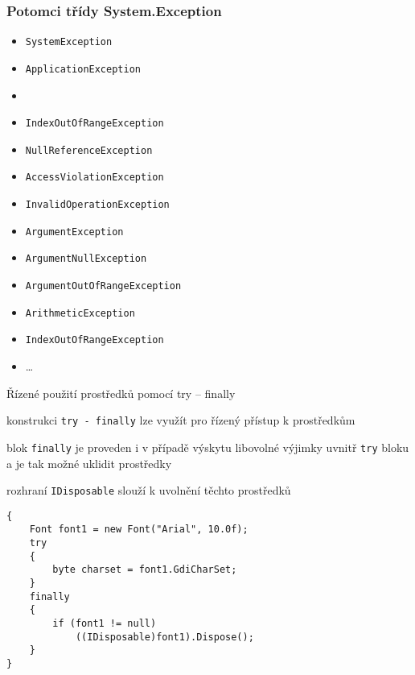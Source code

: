 \begin{frame}[fragile]
\frametitle{Potomci třídy System.Exception}
\begin{noteblock}{}
\begin{itemize}
\item \lstinline|SystemException|
\item \lstinline|ApplicationException|
\item[]
\item \lstinline|IndexOutOfRangeException|
\item \lstinline|NullReferenceException|
\item \lstinline|AccessViolationException|
\item \lstinline|InvalidOperationException|
\item \lstinline|ArgumentException|
\item \lstinline|ArgumentNullException|
\item \lstinline|ArgumentOutOfRangeException|
\item \lstinline|ArithmeticException|
\item \lstinline|IndexOutOfRangeException|
\item \ldots
\end{itemize}
\end{noteblock}

\end{frame}




\begin{frame}[fragile]
\begin{bitemize}{Řízené použití prostředků pomocí try -- finally}
\item konstrukci \lstinline|try - finally| lze využít pro řízený přístup k prostředkům
\item blok \lstinline|finally| je proveden i v případě výskytu libovolné výjimky uvnitř \lstinline|try| bloku a je tak možné uklidit prostředky
\item rozhraní \lstinline|IDisposable| slouží k uvolnění těchto prostředků
\end{bitemize}
\vfill
\begin{yesblock}
\begin{lstlisting}
{
    Font font1 = new Font("Arial", 10.0f);
    try
    {
        byte charset = font1.GdiCharSet;
    }
    finally
    {
        if (font1 != null)
            ((IDisposable)font1).Dispose();
    }
}
\end{lstlisting}
\end{yesblock}
\end{frame}


